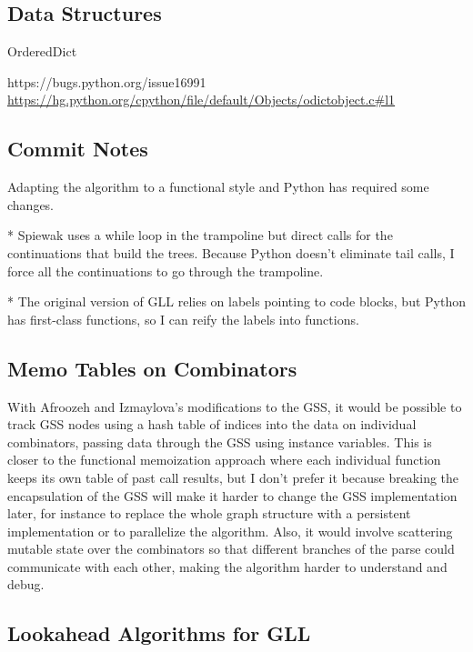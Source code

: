 \documentclass[12pt]{article}
\begin{document}
\subsection{Data Structures}
\label{sec:data_structures}

OrderedDict

https://bugs.python.org/issue16991
\url{https://hg.python.org/cpython/file/default/Objects/odictobject.c#l1}


\subsection{Commit Notes}
\label{sec:commit_notes}

Adapting the algorithm to a functional style and Python has required
some changes.

* Spiewak uses a while loop in the trampoline but direct calls for the
continuations that build the trees.  Because Python doesn't eliminate
tail calls, I force all the continuations to go through the
trampoline.

* The original version of GLL relies on labels pointing to code
blocks, but Python has first-class functions, so I can reify the
labels into functions.



\subsection{Memo Tables on Combinators}
\label{sec:memo_tables}

With Afroozeh and Izmaylova's modifications to the GSS, it would be
possible to track GSS nodes using a hash table of indices into the
data on individual combinators, passing data through the GSS using
instance variables.  This is closer to the functional memoization
approach where each individual function keeps its own table of past
call results, but I don't prefer it because breaking the encapsulation
of the GSS will make it harder to change the GSS implementation later,
for instance to replace the whole graph structure with a persistent
implementation or to parallelize the algorithm.  Also, it would
involve scattering mutable state over the combinators so that
different branches of the parse could communicate with each other,
making the algorithm harder to understand and debug.



\subsection{Lookahead Algorithms for GLL}
\label{sec:gll_lookahead}
\end{document}
